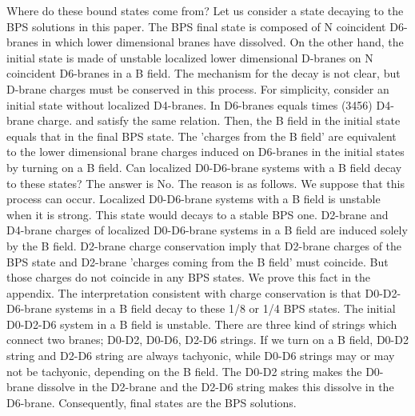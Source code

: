 \documentclass[a4paper,12pt]{article}
\begin{document}
Where do these bound states come from? Let us consider a state decaying to the BPS solutions in this paper. The BPS final state is composed of N coincident D6-branes in which lower dimensional branes have dissolved. On the other hand, the initial state is made of unstable localized lower dimensional D-branes on N coincident D6-branes in a B field. The mechanism for the decay is not clear, but D-brane charges must be conserved in this process. For simplicity, consider an initial state without localized D4-branes. In D6-branes \coordHE{} equals \coordHE{} times (3456) D4-brane charge. \coordHE{} and \coordHE{} satisfy the same relation. Then, the B field in the initial state equals that in the final BPS state. The 'charges from the B field' are equivalent to the lower dimensional brane charges induced on D6-branes in the initial states by turning on a B field. Can localized D0-D6-brane systems with a B field decay to these states? The answer is No. The reason is as follows. We suppose that this process can occur. Localized D0-D6-brane systems with a B field is unstable when it is strong. This state would decays to a stable BPS one. D2-brane and D4-brane charges of localized D0-D6-brane systems in a B field are induced solely by the B field. D2-brane charge conservation imply that D2-brane charges of the BPS state and D2-brane 'charges coming from the B field' must coincide. But those charges do not coincide in any BPS states. We prove this fact in the appendix. The interpretation consistent with charge conservation is that D0-D2-D6-brane systems in a B field decay to these 1/8 or 1/4 BPS states. The initial D0-D2-D6 system in a B field is unstable. There are three kind of strings which connect two branes; D0-D2, D0-D6, D2-D6 strings. If we turn on a B field,  D0-D2 string and D2-D6 string are always tachyonic, while D0-D6 strings may or may not be tachyonic, depending on the B field. The D0-D2 string makes the D0-brane dissolve in the D2-brane and the D2-D6 string makes this dissolve in the D6-brane. Consequently, final states are the BPS solutions.            
\end{document}

